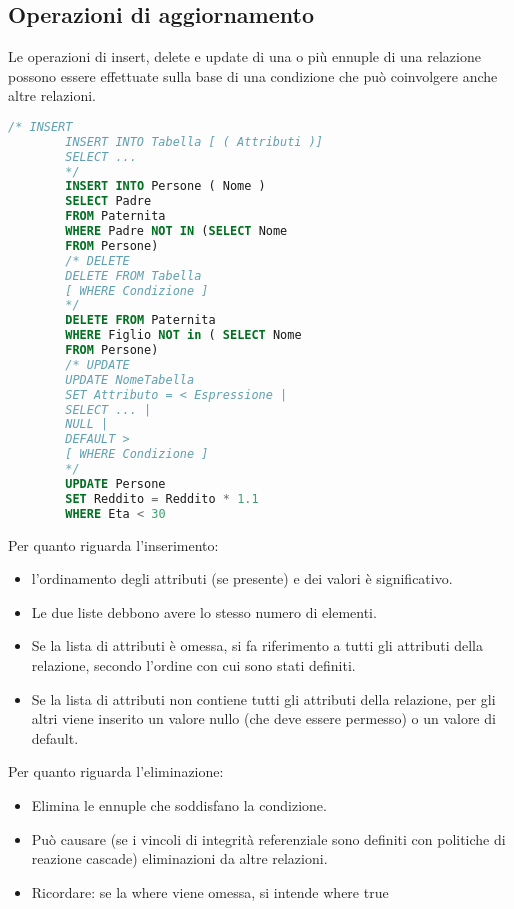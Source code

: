 \documentclass{article}
\begin{document}
\subsection{Operazioni di aggiornamento}
Le operazioni di insert, delete e update di una o più ennuple di una relazione possono essere effettuate sulla base di una condizione che può coinvolgere anche altre relazioni.
\begin{center}
    \begin{lstlisting}[language=SQL]
        /* INSERT 
        INSERT INTO Tabella [ ( Attributi )]
        SELECT ...
        */
        INSERT INTO Persone ( Nome )
        SELECT Padre
        FROM Paternita
        WHERE Padre NOT IN (SELECT Nome
        FROM Persone)
        /* DELETE
        DELETE FROM Tabella
        [ WHERE Condizione ]
        */
        DELETE FROM Paternita
        WHERE Figlio NOT in ( SELECT Nome
        FROM Persone)
        /* UPDATE
        UPDATE NomeTabella
        SET Attributo = < Espressione |
        SELECT ... |
        NULL |
        DEFAULT >
        [ WHERE Condizione ]
        */
        UPDATE Persone
        SET Reddito = Reddito * 1.1
        WHERE Eta < 30
    \end{lstlisting}
\end{center}
Per quanto riguarda l'inserimento:
\begin{itemize}
    \item l'ordinamento degli attributi (se presente) e dei valori è significativo. 
    \item Le due liste debbono avere lo stesso numero di elementi.
    \item Se la lista di attributi è omessa, si fa riferimento a tutti gli attributi della relazione, secondo l’ordine con cui sono stati definiti.
    \item Se la lista di attributi non contiene tutti gli attributi della relazione, per gli altri viene inserito un valore nullo (che deve essere
    permesso) o un valore di default.
\end{itemize}
Per quanto riguarda l'eliminazione:
\begin{itemize}
    \item Elimina le ennuple che soddisfano la condizione.
    \item Può causare (se i vincoli di integrità referenziale sono definiti con
politiche di reazione cascade) eliminazioni da altre relazioni.
    \item Ricordare: se la where viene omessa, si intende where true
\end{itemize}
\end{document}
